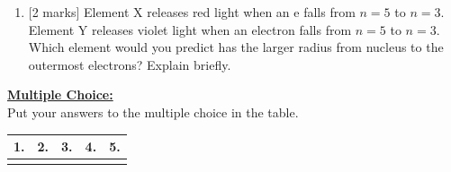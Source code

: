 \documentclass[11pt]{article}
\begin{document}
\begin{enumerate}[leftmargin=*, label=\arabic*., start=12]
    \item {[2 marks]} Element X releases red light when an e falls from $n = 5$ to $n = 3$. Element Y releases violet light when an electron falls from $n = 5$ to $n = 3$. Which element would you predict has the larger radius from nucleus to the outermost electrons? Explain briefly.
    \vspace{12em}
\end{enumerate}

\noindent \underline{\textbf{Multiple Choice:}} \\
Put your answers to the multiple choice in the table. \\
\noindent \begin{tabularx}{\textwidth}{|X|X|X|X|X|}
\hline
1. & 2. & 3. & 4. & 5. \\
\hline
\rule{0pt}{2em} & & & & \\
\hline
\end{tabularx}
\vspace{2em}
\end{document}
